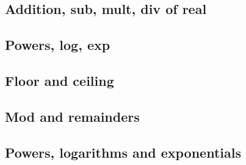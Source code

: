 
\subsection{Addition, sub, mult, div of real}

\subsection{Powers, log, exp}

\subsection{Floor and ceiling}

\subsection{Mod and remainders}

\subsection{Powers, logarithms and exponentials}

